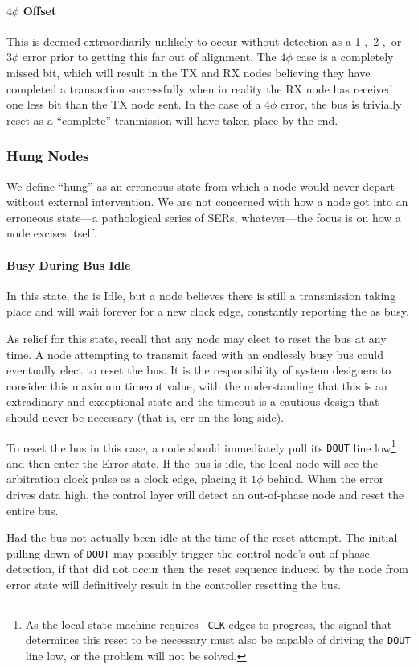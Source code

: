 \paragraph{$4\phi$ Offset}
This is deemed extraordiarily unlikely to occur without detection as a
1-,~2-,~or~$3\phi$ error prior to getting this far out of alignment.
The $4\phi$ case is a
completely missed bit, which will result in the TX and RX nodes believing they
have completed a transaction successfully when in reality the RX node has
received one less bit than the TX node sent. In the case of a $4\phi$ error,
the bus is trivially reset as a ``complete'' tranmission will have taken place
by the end.

\subsubsection{Hung Nodes}
\label{sec:reset-hung}
We define ``hung'' as an erroneous state from which a node would never depart
without external intervention. We are not concerned with how a node got into
an erroneous state---a pathological series of SERs, whatever---the focus is on
how a node excises itself.

\paragraph{Busy During Bus Idle}
In this state, the \bus is Idle, but a node believes there is still a
transmission taking place and will wait forever for a new clock edge,
constantly reporting the \bus as busy.

As relief for this state, recall that any node may elect to reset the bus at
any time. A node attempting to transmit faced with an endlessly busy bus could
eventually elect to reset the bus. It is the responsibility of system
designers to consider this maximum timeout value, with the understanding that
this is an extradinary and exceptional state and the timeout is a cautious
design that should never be necessary (that is, err on the long side).

To reset the bus in this case, a node should immediately pull its {\tt DOUT}
line low\footnote{
  As the local state machine requires \bus~{\tt CLK} edges to progress, the
  signal that determines this reset to be necessary must also be capable of
  driving the {\tt DOUT} line low, or the problem will not be solved.
} and then enter the {\sc Error} state. If the bus is idle, the local node
will see the arbitration clock pulse as a clock edge, placing it $1\phi$
behind. When the {\sc error} drives data high, the control layer will detect
an out-of-phase node and reset the entire bus.

Had the bus not actually been idle at the time of the reset attempt. The
initial pulling down of {\tt DOUT} may possibly trigger the control node's
out-of-phase detection, if that did not occur then the reset sequence induced
by the node from {\sc error} state will definitively result in the controller
resetting the bus.
